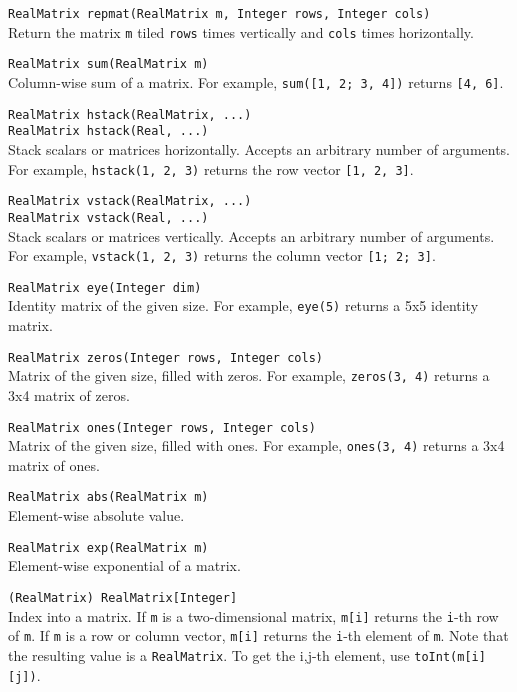 \verb|RealMatrix repmat(RealMatrix m, Integer rows, Integer cols)| \\
Return the matrix \verb|m| tiled \verb|rows| times vertically and \verb|cols|
times horizontally.

\verb|RealMatrix sum(RealMatrix m)| \\
Column-wise sum of a matrix.
For example, \verb|sum([1, 2; 3, 4])| returns \verb|[4, 6]|.

\verb|RealMatrix hstack(RealMatrix, ...)| \\
\verb|RealMatrix hstack(Real, ...)| \\
Stack scalars or matrices horizontally. Accepts an arbitrary number of
arguments.
For example, \verb|hstack(1, 2, 3)| returns the row vector {\tt [1, 2, 3]}.

\verb|RealMatrix vstack(RealMatrix, ...)| \\
\verb|RealMatrix vstack(Real, ...)| \\
Stack scalars or matrices vertically. Accepts an arbitrary number of arguments.
For example, \verb|vstack(1, 2, 3)| returns the column vector {\tt [1; 2; 3]}.

\verb|RealMatrix eye(Integer dim)| \\
Identity matrix of the given size.
For example, \verb|eye(5)| returns a 5x5 identity matrix.

\verb|RealMatrix zeros(Integer rows, Integer cols)| \\
Matrix of the given size, filled with zeros.
For example, \verb|zeros(3, 4)| returns a 3x4 matrix of zeros.

\verb|RealMatrix ones(Integer rows, Integer cols)| \\
Matrix of the given size, filled with ones.
For example, \verb|ones(3, 4)| returns a 3x4 matrix of ones.

\verb|RealMatrix abs(RealMatrix m)| \\
Element-wise absolute value.

\verb|RealMatrix exp(RealMatrix m)| \\
Element-wise exponential of a matrix.

\verb|(RealMatrix) RealMatrix[Integer]| \\
Index into a matrix. If \verb|m| is a two-dimensional matrix, \verb|m[i]|
returns the \verb|i|-th row of \verb|m|. If \verb|m| is a row or column vector,
\verb|m[i]| returns the \verb|i|-th element of \verb|m|. Note that the
resulting value is a \verb|RealMatrix|. To get the i,j-th element, use
\verb|toInt(m[i][j])|.

